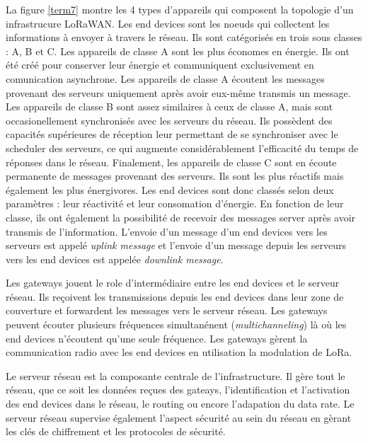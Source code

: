 La figure \ref{term7} montre les 4 types d'appareils qui composent la topologie d'un infrastrucure LoRaWAN.
Les end devices sont les noeuds qui collectent les informations à envoyer à travers le réseau. Ils sont catégorisés en trois sous classes : A, B et C. Les appareils de classe A sont les plus économes en énergie. Ils ont été créé pour conserver leur énergie et communiquent exclusivement en comunication asynchrone. Les appareils de classe A écoutent les messages provenant des serveurs uniquement après avoir eux-même transmis un message. Les appareils de classe B sont assez similaires à ceux de classe A, mais sont occasionellement synchronisés avec les serveurs du réseau. Ils possèdent des capacités supérieures de réception leur permettant de se synchroniser avec le scheduler des serveurs, ce qui augmente considérablement l'efficacité du temps de réponses dans le réseau. Finalement, les appareils de classe C sont en écoute permanente de messages provenant des serveurs. Ils sont les plus réactifs mais également les plus énergivores. Les end devices sont donc classés selon deux paramètres : leur réactivité et leur consomation d'énergie. En fonction de leur classe, ils ont également la possibilité de recevoir des messages server après avoir transmis de l'information. L'envoie d'un message d'un end devices vers les serveurs est appelé \textit{uplink message} et l'envoie d'un message depuis les serveurs vers les end devices est appelée \textit{downlink message}.

\vspace{0.1cm}

Les gateways jouent le role d'intermédiaire entre les end devices et le serveur réseau. Ils reçoivent les transmissions depuis les end devices dans leur zone de couverture
et forwardent les messages vers le serveur réseau. Les gateways peuvent écouter plusieurs fréquences simultanénent (\textit{multichanneling}) là où les end devices n'écoutent qu'une seule fréquence. Les gateways gèrent la communication radio avec les end devices en utilisation la modulation de LoRa.

\vspace{0.1cm}

Le serveur réseau est la composante centrale de l'infrastructure. Il gère tout le réseau, que ce soit les données reçues des gateays, l'identification et l'activation des end devices dans le réseau, le routing ou encore l'adapation du data rate. Le serveur réseau supervise également l'aspect sécurité au sein du réseau en gèrant les clés de chiffrement et les protocoles de sécurité.

